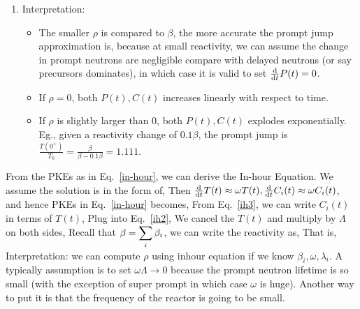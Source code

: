 \documentclass{school-22.211-notes}
\begin{document}
\begin{enumerate}
\item Interpretation: 
\begin{itemize}
\item {} The smaller $\rho$ is compared to $\beta$, the more accurate the prompt jump approximation is, because at small reactivity, we can assume the change in prompt neutrons are negligible compare with delayed neutrons (or say precursors dominates), in which case it is valid to set $\frac{\mathrm{d}}{\mathrm{d}t} P(t) = 0$. 

\item If $\rho = 0$, both $P(t), C(t)$ increases linearly with respect to time. 

\item If $\rho$ is slightly larger than 0, both $P(t), C(t)$ explodes exponentially. Eg., given a reactivity change of $0.1\beta$, the prompt jump is $\frac{T(0^+)}{T_0} = \frac{\beta}{\beta - 0.1 \beta} = 1.111$. 
\end{itemize}
\end{enumerate}




From the PKEs as in Eq.~\ref{in-hour}, we can derive the In-hour Equation. We assume the solution is in the form of,
Then $\frac{\mathrm{d}}{\mathrm{d}t} T(t) \approx \omega T(t), \frac{\mathrm{d}}{\mathrm{d}t} C_i(t) \approx \omega C_i(t)$, and hence PKEs in Eq.~\ref{in-hour} becomes, 
From Eq.~\ref{ih3}, we can write $C_i(t)$ in terms of $T(t)$, 
Plug into Eq.~\ref{ih2}, 
We cancel the $T(t)$ and multiply by $\Lambda$ on both sides,  
Recall that $\beta = \displaystyle\sum_i \beta_i$, we can write the reactivity as, 
That is, 
Interpretation: we can compute $\rho$ using inhour equation if we know $\beta_i, \omega, \lambda_i$. 
A typically assumption is to set $\omega \Lambda \to 0$ because the prompt neutron lifetime is so small (with the exception of super prompt in which case $\omega$ is huge). Another way to put it is that the frequency of the reactor is going to be small. 
\end{document}
